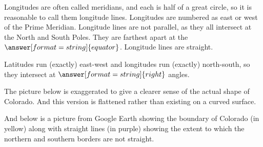 \documentclass{ximera}
\begin{document}
\begin{problem}
\begin{problem}
\begin{problem}

Longitudes are often called meridians, and each is half of a great circle, so it is reasonable to call them longitude lines.  Longitudes are numbered as east or west of the Prime Meridian.  Longitude lines are not parallel, as they all intersect at the North and South Poles. They are farthest apart at the $\answer[format=string]{equator}$.  Longitude lines are straight.  

Latitudes run (exactly) east-west and longitudes run (exactly) north-south, so they intersect at $\answer[format=string]{right}$ angles. 

The picture below is exaggerated to give a clearer sense of the actual shape of Colorado.  And this version is flattened rather than existing on a curved surface. 

\begin{center}
\end{center}

And below is a picture from Google Earth showing the boundary of Colorado (in yellow) along with straight lines (in purple) showing the extent to which the northern and southern borders are not straight. 


\end{problem}
\end{problem}
\end{problem}
\end{document}
